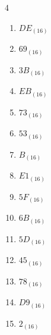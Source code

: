\begin{multicols}{4}
\begin{enumerate}
  \item $DE_{(16)}$

        \phantom{$=222$}

  \item $69_{(16)}$

        \phantom{$=105$}

  \item $3B_{(16)}$

        \phantom{$=59$}

  \item $EB_{(16)}$

        \phantom{$=235$}

  \item $73_{(16)}$

        \phantom{$=115$}

  \item $53_{(16)}$

        \phantom{$=83$}

  \item $B_{(16)}$

        \phantom{$=11$}

  \item $E1_{(16)}$

        \phantom{$=225$}

\columnbreak %

\resetques

  \item $5F_{(16)}$

        \phantom{$=95$}

  \item $6B_{(16)}$

        \phantom{$=107$}

  \item $5D_{(16)}$

        \phantom{$=93$}

  \item $45_{(16)}$

        \phantom{$=69$}

  \item $78_{(16)}$

        \phantom{$=120$}

  \item $D9_{(16)}$

        \phantom{$=217$}

  \item $2_{(16)}$

        \phantom{$=2$}


\end{enumerate}
\end{multicols}
